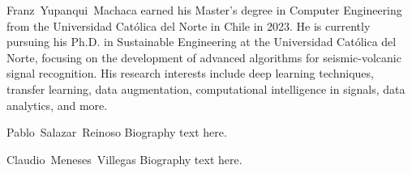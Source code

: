 \documentclass[journal]{IEEEtran}
\begin{document}
%
\begin{IEEEbiography}{Franz~Yupanqui~Machaca}
earned his Master's degree in Computer Engineering from the Universidad Católica del Norte in Chile in 2023. He is currently pursuing his Ph.D. in Sustainable Engineering at the Universidad Católica del Norte, focusing on the development of advanced algorithms for seismic-volcanic signal recognition. His research interests include deep learning techniques, transfer learning, data augmentation, computational intelligence in signals, data analytics, and more.
\end{IEEEbiography}

\begin{IEEEbiography}{Pablo~Salazar~Reinoso}
Biography text here.
\end{IEEEbiography}

\begin{IEEEbiography}{Claudio~Meneses~Villegas}
Biography text here.
\end{IEEEbiography}






\end{document}
